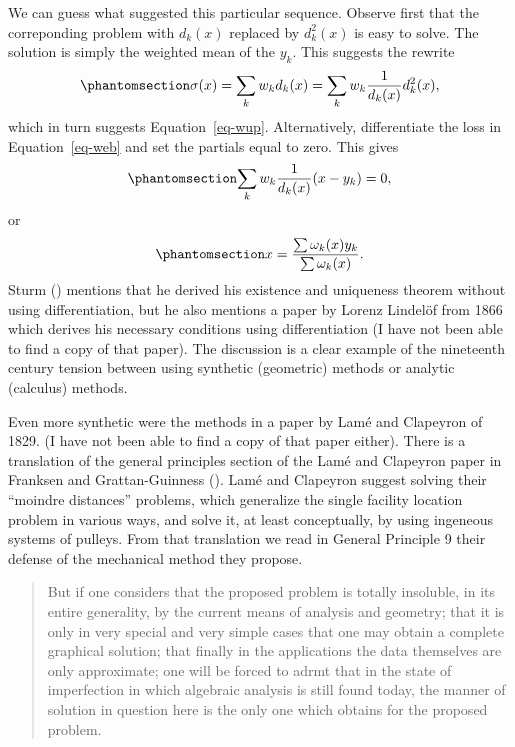 \documentclass[
  12pt,
  letterpaper,
  DIV=11,
  numbers=noendperiod]{scrartcl}
\theoremstyle{definition}
\theoremstyle{definition}
\theoremstyle{plain}
\theoremstyle{plain}
\theoremstyle{plain}
\theoremstyle{remark}
\begin{document}
We can guess what suggested this particular sequence. Observe first that
the correponding problem with \(d_k(x)\) replaced by \(d_k^2(x)\) is
easy to solve. The solution is simply the weighted mean of the \(y_k\).
This suggests the rewrite \begin{equation}\phantomsection\label{eq-rew}{
\sigma(x)=\sum_k w_kd_k(x)=\sum_kw_k \frac{1}{d_k(x)}d_k^2(x),
}\end{equation} which in turn suggests Equation~\ref{eq-wup}.
Alternatively, differentiate the loss in Equation~\ref{eq-web} and set
the partials equal to zero. This gives
\begin{equation}\phantomsection\label{eq-wstatio1}{
\sum_k w_k\frac{1}{d_k(x)}(x-y_k)=0,
}\end{equation} or \begin{equation}\phantomsection\label{eq-wstatio2}{
x=\frac{\sum\omega_k(x)y_k}{\sum\omega_k(x)}.
}\end{equation} Sturm () mentions that he
derived his existence and uniqueness theorem without using
differentiation, but he also mentions a paper by Lorenz Lindelöf from
1866 which derives his necessary conditions using differentiation (I
have not been able to find a copy of that paper). The discussion is a
clear example of the nineteenth century tension between using synthetic
(geometric) methods or analytic (calculus) methods.

Even more synthetic were the methods in a paper by Lamé and Clapeyron of
1829. (I have not been able to find a copy of that paper either). There
is a translation of the general principles section of the Lamé and
Clapeyron paper in Franksen and Grattan-Guinness
(). Lamé and Clapeyron
suggest solving their ``moindre distances'' problems, which generalize
the single facility location problem in various ways, and solve it, at
least conceptually, by using ingeneous systems of pulleys. From that
translation we read in General Principle 9 their defense of the
mechanical method they propose.

\begin{quote}
But if one considers that the proposed problem is totally insoluble, in
its entire generality, by the current means of analysis and geometry;
that it is only in very special and very simple cases that one may
obtain a complete graphical solution; that finally in the applications
the data themselves are only approximate; one will be forced to adrmt
that in the state of imperfection in which algebraic analysis is still
found today, the manner of solution in question here is the only one
which obtains for the proposed problem.
\end{quote}
\end{document}
